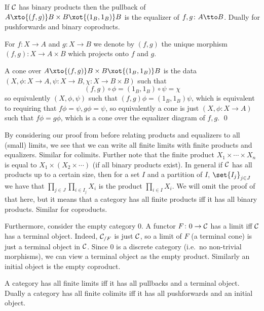 \eproof

\blemm

    If ${{\cal C}}$ has binary products then the pullback of $A\xto{(f,g)}B\times B\xot{(1_B,1_B)}B$ is the equalizer of $f,g\colon A\tto B$.
    Dually for pushforwards and binary coproducts.

\elemm

For $f\colon X\to A$ and $g\colon X\to B$ we denote by $(f,g)$ the unique morphism $(f,g)\colon X\to A\times B$ which projects onto $f$ and $g$.

\bproof

    A cone over $A\xto{(f,g)}B\times B\xot{(1_B,1_B)}B$ is the data $(X,\phi\colon X\to A,\psi\colon X\to B,\chi\colon X\to B\times B)$ such that
    $$ (f,g)\circ\phi = (1_B,1_B)\circ\psi = \chi $$
    so equivalently $(X,\phi,\psi)$ such that $(f,g)\phi=(1_B,1_B)\psi$, which is equivalent to requiring that $f\phi=\psi,g\phi=\psi$, so equivalently a cone
    is just $(X,\phi\colon X\to A)$ such that $f\phi=g\phi$, which is a cone over the equalizer diagram of $f,g$.
    \qed

\eproof

By considering our proof from before relating products and equalizers to all (small) limits, we see that we can write all finite limits with finite products and equalizers.
Similar for colimits.
Further note that the finite product $X_1\times\cdots\times X_n$ is equal to $X_1\times(X_2\times\cdots)$ (if all binary products exist).
In general if ${{\cal C}}$ has all products up to a certain size, then for a set $I$ and a partition of $I$, $\set{I_j}_{j\in J}$ we have that $\prod_{j\in J}\prod_{i\in I_j}X_i$
is the product $\prod_{i\in I}X_i$.
We will omit the proof of that here, but it means that a category has all finite products iff it has all binary products.
Similar for coproducts.

Furthermore, consider the empty category $0$.
A functor $F\colon0\to{{\cal C}}$ has a limit iff ${{\cal C}}$ has a terminal object.
Indeed, ${{\cal C}}_{/F}$ is just ${{\cal C}}$, so a limit of $F$ (a terminal cone) is just a terminal object in ${{\cal C}}$.
Since $0$ is a discrete category (i.e.\ no non-trivial morphisms), we can view a terminal object as the empty product.
Similarly an initial object is the empty coproduct.

\bcoro

    A category has all finite limits iff it has all pullbacks and a terminal object.
    Dually a category has all finite colimits iff it has all pushforwards and an initial object.

